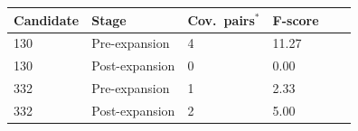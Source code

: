 \begin{tabular}{p{}p{}p{}p{}p{}p{}}
\hline
\textbf{Candidate} & \textbf{Stage} & \textbf{Cov.\ pairs$^{*}$} & \textbf{F-score} \\
\hline
130 & Pre-expansion  & 4 & 11.27 \\
130 & Post-expansion & 0 & 0.00 \\
332 & Pre-expansion  & 1 & 2.33 \\
332 & Post-expansion & 2 & 5.00 \\
\hline
\end{tabular}